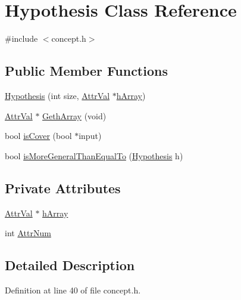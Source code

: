 \hypertarget{class_hypothesis}{\section{Hypothesis Class Reference}
\label{class_hypothesis}
}


{\ttfamily \#include $<$concept.\-h$>$}

\subsection*{Public Member Functions}
\begin{DoxyCompactItemize}
\item 
\hyperlink{class_hypothesis_a3bca791c3dcc2aa2f0d1e8dc16fa2cf3}{Hypothesis} (int size, \hyperlink{concept_8h_a9680d29b8d997e4adbf99481b65e897d}{Attr\-Val} $\ast$\hyperlink{class_hypothesis_a2b381d29eb7a6101eda6fcd3a2e5380b}{h\-Array})
\item 
\hyperlink{concept_8h_a9680d29b8d997e4adbf99481b65e897d}{Attr\-Val} $\ast$ \hyperlink{class_hypothesis_a9f7689475f40bcd554b01ad7670aec8a}{Geth\-Array} (void)
\item 
bool \hyperlink{class_hypothesis_a65026e3096cc134fb15e54c482b7bd7a}{is\-Cover} (bool $\ast$input)
\item 
bool \hyperlink{class_hypothesis_ab8d9d311060a302fe11457b067898e24}{is\-More\-General\-Than\-Equal\-To} (\hyperlink{class_hypothesis}{Hypothesis} h)
\end{DoxyCompactItemize}
\subsection*{Private Attributes}
\begin{DoxyCompactItemize}
\item 
\hyperlink{concept_8h_a9680d29b8d997e4adbf99481b65e897d}{Attr\-Val} $\ast$ \hyperlink{class_hypothesis_a2b381d29eb7a6101eda6fcd3a2e5380b}{h\-Array}
\item 
int \hyperlink{class_hypothesis_acb02bcc74b95846666f713143be4e550}{Attr\-Num}
\end{DoxyCompactItemize}


\subsection{Detailed Description}


Definition at line 40 of file concept.\-h.



